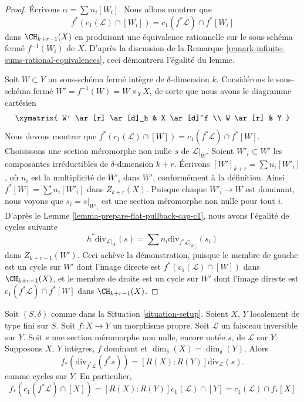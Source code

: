 \begin{proof}
Écrivons $\alpha = \sum n_i[W_i]$. Nous allons montrer que
$$
f^*(c_1(\mathcal{L}) \cap [W_i]) = c_1(f^*\mathcal{L}) \cap f^*[W_i]
$$
dans $\CH_{k + r - 1}(X)$ en produisant une équivalence rationnelle
sur le sous-schéma fermé $f^{-1}(W_i)$ de $X$.
D'après la discussion de la
Remarque \ref{remark-infinite-sums-rational-equivalences},
ceci démontrera l'égalité du lemme.

\medskip\noindent
Soit $W \subset Y$ un sous-schéma fermé intègre de $\delta$-dimension $k$.
Considérons le sous-schéma fermé $W' = f^{-1}(W) = W \times_Y X$,
de sorte que nous avons le diagramme cartésien
$$
\xymatrix{
W' \ar[r] \ar[d]_h & X \ar[d]^f \\
W \ar[r] & Y
}
$$
Nous devons montrer que
$f^*(c_1(\mathcal{L}) \cap [W]) = c_1(f^*\mathcal{L}) \cap f^*[W]$.
Choisissons une section méromorphe non nulle $s$ de $\mathcal{L}|_W$.
Soient $W'_i \subset W'$ les composantes irréductibles de
$\delta$-dimension $k + r$. Écrivons $[W']_{k + r} = \sum n_i[W'_i]$,
où $n_i$ est la multiplicité de $W'_i$ dans $W'$, conformément à la définition.
Ainsi $f^*[W] = \sum n_i[W'_i]$ dans $Z_{k + r}(X)$.
Puisque chaque $W'_i \to W$ est dominant, nous
voyons que $s_i = s|_{W'_i}$ est une section méromorphe non nulle pour
tout $i$. D'après le Lemme \ref{lemma-prepare-flat-pullback-cap-c1},
nous avons l'égalité de cycles suivante
$$
h^*\text{div}_{\mathcal{L}|_W}(s) =
\sum n_i\text{div}_{f^*\mathcal{L}|_{W'_i}}(s_i)
$$
dans $Z_{k + r - 1}(W')$. Ceci achève la démonstration, puisque
le membre de gauche est un cycle sur $W'$ dont l'image directe est
$f^*(c_1(\mathcal{L}) \cap [W])$ dans $\CH_{k + r - 1}(X)$,
et le membre de droite est un cycle sur $W'$ dont l'image directe est
$c_1(f^*\mathcal{L}) \cap f^*[W]$ dans $\CH_{k + r - 1}(X)$.
\end{proof}

\begin{lemma}
\label{lemma-equal-c1-as-cycles}
Soit $(S, \delta)$ comme dans la Situation \ref{situation-setup}.
Soient $X$, $Y$ localement de type fini sur $S$.
Soit $f : X \to Y$ un morphisme propre.
Soit $\mathcal{L}$ un faisceau inversible sur $Y$.
Soit $s$ une section méromorphe non nulle, encore notée $s$, de $\mathcal{L}$ sur $Y$.
Supposons $X$, $Y$ intègres, $f$ dominant et $\dim_\delta(X) = \dim_\delta(Y)$.
Alors
$$
f_*\left(\text{div}_{f^*\mathcal{L}}(f^*s)\right) =
[R(X) : R(Y)]\text{div}_\mathcal{L}(s).
$$
comme cycles sur $Y$. En particulier,
$$
f_*(c_1(f^*\mathcal{L}) \cap [X]) =
[R(X) : R(Y)] c_1(\mathcal{L}) \cap [Y] =
c_1(\mathcal{L}) \cap f_*[X]
$$
\end{lemma}


